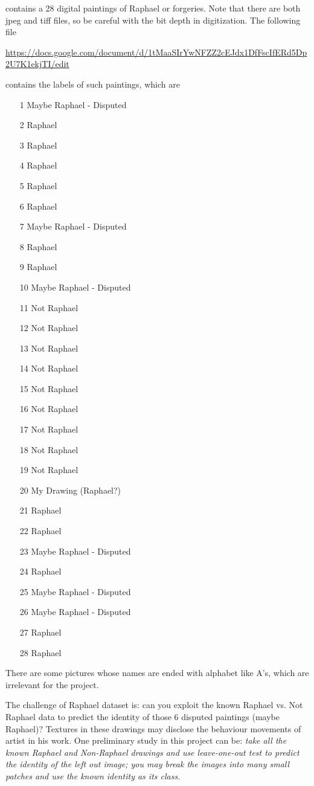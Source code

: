 \documentclass[11pt]{article}
\begin{document}
\noindent contains a 28 digital paintings of Raphael or forgeries. Note that there are both jpeg and tiff files, so be careful with the bit depth in digitization. The following file

\url{https://docs.google.com/document/d/1tMaaSIrYwNFZZ2cEJdx1DfFscIfERd5Dp2U7K1ekjTI/edit}

\noindent contains the labels of such paintings, which are 
\begin{enumerate}
\item[1] Maybe Raphael - Disputed
\item[2] Raphael
\item[3] Raphael
\item[4] Raphael
\item[5] Raphael
\item[6] Raphael
\item[7] Maybe Raphael - Disputed
\item[8] Raphael
\item[9] Raphael
\item[10] Maybe Raphael - Disputed
\item[11] Not Raphael
\item[12] Not Raphael
\item[13] Not Raphael
\item[14] Not Raphael
\item[15] Not Raphael
\item[16] Not Raphael
\item[17] Not Raphael
\item[18] Not Raphael
\item[19] Not Raphael
\item[20] My Drawing (Raphael?)
\item[21] Raphael
\item[22] Raphael
\item[23] Maybe Raphael - Disputed
\item[24] Raphael
\item[25] Maybe Raphael - Disputed
\item[26] Maybe Raphael - Disputed
\item[27] Raphael
\item[28] Raphael
\end{enumerate}
There are some pictures whose names are ended with alphabet like A's, which are irrelevant for the project. 

The challenge of Raphael dataset is: can you exploit the known Raphael vs. Not Raphael data to predict the identity of those 6 disputed paintings (maybe Raphael)? Textures in these drawings may disclose the behaviour movements of artist in his work. One preliminary study in this project can be: \emph{take all the known Raphael and Non-Raphael drawings and use leave-one-out test to predict the identity of the left out image; you may break the images into many small patches and use the known identity as its class.}      
\end{document}
